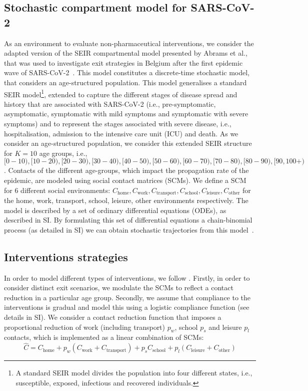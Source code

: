 \documentclass{article}
\renewcommand{\cite}[1]{\citep{#1}}
\newcommand{\chome}{C_{\text{home}}}
\newcommand{\cwork}{C_{\text{work}}}
\newcommand{\ctransport}{C_{\text{transport}}}
\newcommand{\cschool}{C_{\text{school}}}
\newcommand{\cleisure}{C_{\text{leisure}}}
\newcommand{\cother}{C_{\text{other}}}
\newcommand{\agegroups}{K}
\begin{document}
\subsection{Stochastic compartment model for SARS-CoV-2}
\label{sec:sars-cov2-momdp_model}
As an environment to evaluate non-pharmaceutical interventions, we consider the adapted version of the SEIR compartmental model presented by Abrams et al., that was used to investigate exit strategies in Belgium after the first epidemic wave of SARS-CoV-2~\cite{abrams2021modelling}. This model constitutes a discrete-time stochastic model, that considers an age-structured population. This model generalises a standard SEIR model\footnote{A standard SEIR model divides the population into four different states, i.e., susceptible, exposed, infectious and recovered individuals.}, extended to capture the different stages of disease spread and history that are associated with SARS-CoV-2 (i.e., pre-symptomatic, asymptomatic, symptomatic with mild symptoms and symptomatic with severe symptoms) and to represent the stages associated with severe disease, i.e., hospitalisation, admission to the intensive care unit (ICU) and death. 
As we consider an age-structured population, we consider this extended SEIR structure for $\agegroups = 10$ age groups,  i.e., $[0-10), [10-20), [20-30), [30-40), [40-50), [50-60), [60-70), [70-80), [80-90), [90,100+)$. Contacts of the different age-groups, which impact the propagation rate of the epidemic, are modeled using social contact matrices (SCMs). We define a SCM for 6 different social environments: $\chome, \cwork, \ctransport, \cschool, \cleisure, \cother$ for the home, work, transport, school, leisure, other environments respectively.
The model is described by a set of ordinary differential equations (ODEs), as described in SI.
By formulating this set of differential equations a chain-binomial process (as detailed in SI) we can obtain stochastic trajectories from this model~\cite{abrams2021modelling}.

\subsection{Interventions strategies}
\label{sec:interventions}
In order to model different types of interventions, we follow \citet{abrams2021modelling}. Firstly, in order to consider distinct exit scenarios, we modulate the SCMs to reflect a contact reduction in a particular age group. Secondly, we assume that compliance to the interventions is gradual and model this using a logistic compliance function (see details in SI).
We consider a contact reduction function that imposes a proportional reduction of work (including transport) $p_w$, school $p_s$ and leisure $p_l$ contacts, which is implemented as a linear combination of SCMs:
\begin{equation}
\label{eq:scm}
    \hat{C} = \chome + p_w (\cwork + \ctransport) + p_s \cschool + p_l (\cleisure + \cother)
\end{equation}
\end{document}
